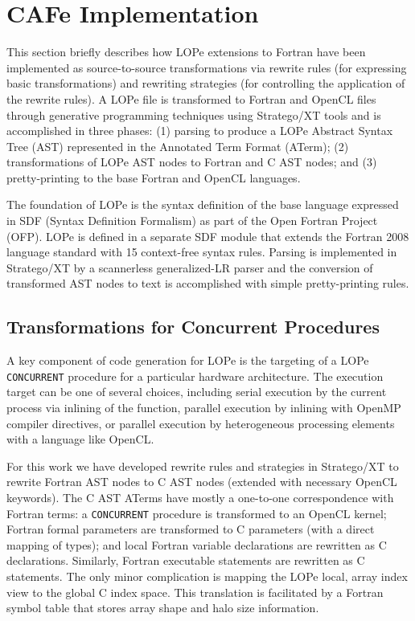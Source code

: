 \section{CAFe Implementation}

This section briefly describes how LOPe extensions to Fortran have been implemented as
source-to-source transformations via rewrite rules (for expressing basic transformations) and
rewriting strategies (for controlling the application of the rewrite rules).  A LOPe file is
transformed to Fortran and OpenCL files through generative programming techniques using
Stratego/XT tools\cite{Bravenboer200852} and is accomplished in three phases: (1) parsing to
produce a LOPe Abstract Syntax Tree (AST) represented in the Annotated Term
Format (ATerm\cite{DBLP:journals/spe/BrandJKO00}); (2) transformations of LOPe AST nodes to Fortran
and C AST nodes; and (3) pretty-printing to the base Fortran and OpenCL languages.

The foundation of LOPe is the syntax definition of the base language expressed in
SDF (Syntax Definition Formalism) as part of the Open Fortran Project (OFP)\cite{OFP:git:url}.
LOPe is defined in a separate SDF module that extends the Fortran 2008 language standard with 15
context-free syntax rules.  Parsing is implemented in Stratego/XT by a scannerless generalized-LR
parser and the conversion of transformed AST nodes to text is accomplished with simple
pretty-printing rules.


\subsection{Transformations for Concurrent Procedures}

A key component of code generation for LOPe is the targeting of a LOPe \texttt{CONCURRENT}
procedure for a particular hardware architecture.  The execution target can be one
of several choices, including serial execution by the current process via inlining
of the function, parallel execution by inlining with OpenMP compiler directives, or parallel
execution by heterogeneous processing elements with a language like OpenCL.

For this work we have developed rewrite rules and strategies in Stratego/XT to rewrite Fortran AST
nodes to C AST nodes (extended with necessary OpenCL keywords).  The C AST ATerms have mostly a
one-to-one correspondence with Fortran terms: a \texttt{CONCURRENT} procedure is transformed to an
OpenCL kernel; Fortran formal parameters are transformed to C parameters (with a direct mapping of
types); and local Fortran variable declarations are rewritten as C declarations.  Similarly,
Fortran executable statements are rewritten as C statements.  The only
minor complication is mapping the LOPe local, array index view to the global C index space.  This
translation is facilitated by a Fortran symbol table that stores array shape and halo size
information.

